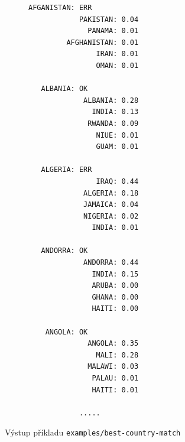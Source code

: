 \documentclass[a4paper]{article}
\begin{document}
\begin{figure}[h]
\centering
\begin{subfigure}{0.6\textwidth}
\begin{lstlisting}
AFGANISTAN: ERR
            PAKISTAN: 0.04
              PANAMA: 0.01
         AFGHANISTAN: 0.01
                IRAN: 0.01
                OMAN: 0.01

   ALBANIA: OK
             ALBANIA: 0.28
               INDIA: 0.13
              RWANDA: 0.09
                NIUE: 0.01
                GUAM: 0.01

   ALGERIA: ERR
                IRAQ: 0.44
             ALGERIA: 0.18
             JAMAICA: 0.04
             NIGERIA: 0.02
               INDIA: 0.01

   ANDORRA: OK
             ANDORRA: 0.44
               INDIA: 0.15
               ARUBA: 0.00
               GHANA: 0.00
               HAITI: 0.00

    ANGOLA: OK
              ANGOLA: 0.35
                MALI: 0.28
              MALAWI: 0.03
               PALAU: 0.01
               HAITI: 0.01

            .....
\end{lstlisting}
\end{subfigure}
\caption{Výstup příkladu \texttt{examples/best-country-match}}
\end{figure}

\FloatBarrier


\end{document}
